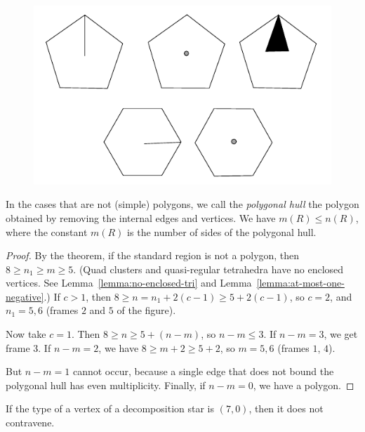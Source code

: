 \begin{figure}[htb]
  \centering
  \includegraphics{PS/diag71.pdf} %
  \caption{}
  \label{fig:std-aggregates}
\end{figure}


In the cases that are not (simple) polygons, we call the {\it polygonal
hull\/} the polygon obtained by removing the internal edges and
vertices. We have $m(R)\le n(R)$, where the constant $m(R)$ is the
number of sides of the polygonal hull.

\begin{proof}
By the theorem, if the standard region is not a polygon, then $8\ge
n_1\ge m\ge 5$. (Quad clusters and quasi-regular tetrahedra have no
enclosed vertices. See Lemma~\ref{lemma:no-enclosed-tri} and
Lemma~\ref{lemma:at-most-one-negative}.) If $c>1$, then $8\ge
n=n_1+2(c-1)\ge 5+2(c-1)$, so $c=2$, and $n_1=5,6$ (frames $2$ and $5$
of the figure).

Now take $c=1$.    Then $8\ge n\ge 5+(n-m)$, so $n-m\le 3$.  If $n-m=3$,
we get frame $3$. If $n-m=2$, we have $8\ge m+2\ge 5+2$, so $m=5,6$
(frames $1$, $4$).

But $n-m=1$ cannot occur, because a single edge that does not bound the
polygonal hull has even multiplicity.  Finally, if $n-m=0$, we have a
polygon.
\end{proof}

\begin{corollary} \label{lemma:70}
If the type of a vertex of a decomposition star is $(7,0)$, then
it does not contravene.
\end{corollary}

